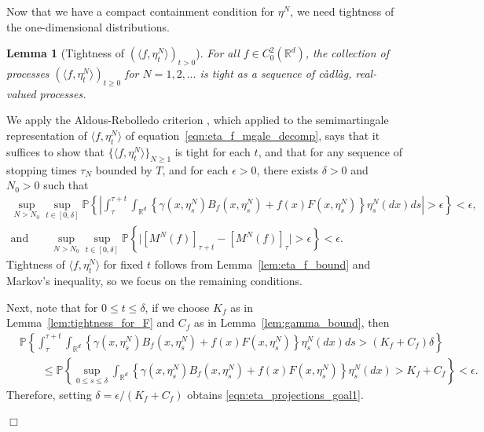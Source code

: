 \documentclass[12pt]{article}
\newenvironment {proof}{{\noindent\bf Proof }}{\hfill $\Box$ \medskip}
\newtheorem{lemma}[theorem]{Lemma}
\newcommand{\IP}{\mathbb P}
\newcommand{\IR}{\mathbb R}
\begin{document}
Now that we have a compact containment condition for $\eta^N$,
we need tightness of the one-dimensional distributions.

\begin{lemma}[Tightness of $(\langle f, \eta^{N}_t \rangle )_{t>0}$]
    \label{lem:eta_projections_tightness}
For all $f \in C^{2}_{0}(\IR^d)$, 
the collection of processes
$(\langle f, \eta^{N}_t \rangle)_{t \geq 0}$
for $N = 1, 2, \ldots$ is tight as a sequence of c\`adl\`ag, real-valued processes.
\end{lemma}

\begin{proof}
We apply the Aldous-Rebolledo criterion \citep{rebolledo:1980}, which 
applied to the semimartingale representation of $\langle f, \eta^N_t\rangle$
of equation~\eqref{eqn:eta_f_mgale_decomp},
says that it suffices to show that 
$\{\langle f, \eta^N_t \rangle\}_{N \ge 1}$ is tight for each $t$, and that
for any sequence of stopping times $\tau_N$ bounded by $T$,
and for each $\epsilon > 0$, there exists $\delta > 0$ and $N_0 > 0$ such that 
\begin{gather}
        \label{eqn:eta_projections_goal1}
    \sup_{N > N_0}
    \sup_{t \in [0, \delta]}
    \IP\left\{\left|
            \int_\tau^{\tau + t}
            \int_{\IR^d}
            \left\{
                \gamma(x, \eta^N_s) B_f(x, \eta^N_s)
                + f(x) F(x, \eta^N_s)
            \right\} 
            \eta^N_s(dx)
            ds
        \right|> \epsilon \right\}
        < \epsilon ,
    \\ \text{and} \qquad
        \label{eqn:eta_projections_goal2}
    \sup_{N > N_0}
    \sup_{t \in [0, \delta]}
    \IP\left\{\big|
        [M^{N}(f)]_{\tau + t} 
            - [M^{N}(f)]_\tau \big|
        > \epsilon
    \right\}
    < \epsilon.
\end{gather}
Tightness of $\langle f, \eta^N_t\rangle$ for fixed $t$
follows from Lemma~\ref{lem:eta_f_bound} and Markov's inequality,
so we focus on the remaining conditions.

Next, note that for $0 \le t \le \delta$,
if we choose $K_f$ as in Lemma~\ref{lem:tightness_for_F}
and $C_f$ as in Lemma~\ref{lem:gamma_bound},
then
\begin{align*}
    &
    \IP\left\{
        \int_\tau^{\tau + t}
        \int_{\IR^d}
        \left\{
            \gamma(x, \eta^N_s) B_f(x, \eta^N_s)
            + f(x) F(x, \eta^N_s)
        \right\} 
        \eta^N_s(dx)
        ds
        > (K_f + C_f) \delta
    \right\}
    \\ & \qquad \le
    \IP\left\{
        \sup_{0 \le s \le \delta}
        \int_{\IR^d} \left\{
            \gamma(x, \eta^N_s) B_f(x, \eta^N_s)
            + f(x) F(x, \eta^N_s)
        \right\} \eta^N_s(dx)
        >
        K_f + C_f
    \right\}
    < \epsilon .
\end{align*}
Therefore, setting $\delta = \epsilon / (K_f + C_f)$
obtains \eqref{eqn:eta_projections_goal1}.


\end{proof}
\end{document}
